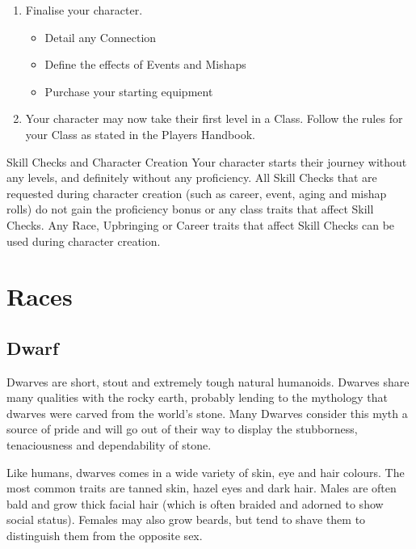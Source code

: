 \documentclass[10pt,twoside]{article}
\begin{document}
\begin{multicols}{2}
\begin{enumerate}
\begin{itemize}
\end{itemize}
\item Finalise your character.
\begin{itemize}
\item Detail any Connection
\item Define the effects of Events and Mishaps
\item Purchase your starting equipment
\end{itemize}
\item Your character may now take their first level in a Class. Follow the rules for your Class as stated in the Players Handbook.
\end{enumerate}

\begin{commentbox}{Skill Checks and Character Creation}
Your character starts their journey without any levels, and definitely without any proficiency. All Skill Checks that are requested during character creation (such as career, event, aging and mishap rolls) do not gain the proficiency bonus or any class traits that affect Skill Checks.
Any Race, Upbringing or Career traits that affect Skill Checks can be used during character creation.
\end{commentbox}

\end{multicols}

\newpage


\section{Races}

\subsection{Dwarf}

Dwarves are short, stout and extremely tough natural humanoids. Dwarves share many qualities with the rocky earth, probably lending to the mythology that dwarves were carved from the world's stone. Many Dwarves consider this myth a source of pride and will go out of their way to display the stubborness, tenaciousness and dependability of stone.

Like humans, dwarves comes in a wide variety of skin, eye and hair colours. The most common traits are tanned skin, hazel eyes and dark hair. Males are often bald and grow thick facial hair (which is often braided and adorned to show social status). Females may also grow beards, but tend to shave them to distinguish them from the opposite sex.
\end{document}
